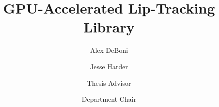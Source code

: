 \documentclass[twoside]{scu-thesis}
\author{Alex DeBoni}
\author{Jesse Harder}
\title{GPU-Accelerated Lip-Tracking Library}
\begin{document}
\frontmatter
\signature{Thesis Advisor}
\signature{Department Chair}

\maketitle


\tableofcontents
\listoffigures

\mainmatter















\backmatter

\end{document}

